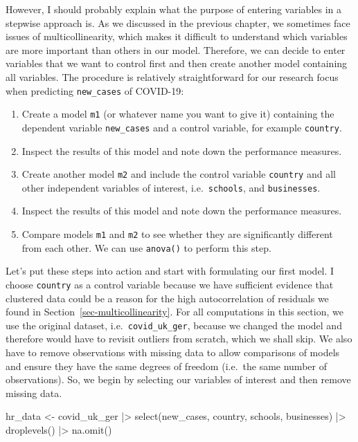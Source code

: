 \documentclass[
  letterpaper,
  DIV=11,
  numbers=noendperiod]{scrreprt}
\newenvironment{Shaded}{\begin{snugshade}}{\end{snugshade}}
\newcommand{\FunctionTok}[1]{\textcolor[rgb]{0.28,0.35,0.67}{#1}}
\newcommand{\NormalTok}[1]{\textcolor[rgb]{0.00,0.23,0.31}{#1}}
\newcommand{\OtherTok}[1]{\textcolor[rgb]{0.00,0.23,0.31}{#1}}
\newcommand{\SpecialCharTok}[1]{\textcolor[rgb]{0.37,0.37,0.37}{#1}}
\providecommand{\tightlist}{%
  \setlength{\itemsep}{0pt}\setlength{\parskip}{0pt}}\usepackage{longtable,booktabs,array}
\begin{document}
However, I should probably explain what the purpose of entering
variables in a stepwise approach is. As we discussed in the previous
chapter, we sometimes face issues of multicollinearity, which makes it
difficult to understand which variables are more important than others
in our model. Therefore, we can decide to enter variables that we want
to control first and then create another model containing all variables.
The procedure is relatively straightforward for our research focus when
predicting \texttt{new\_cases} of COVID-19:

\begin{enumerate}
\def\labelenumi{\arabic{enumi}.}
\tightlist
\item
  Create a model \texttt{m1} (or whatever name you want to give it)
  containing the dependent variable \texttt{new\_cases} and a control
  variable, for example \texttt{country}.
\item
  Inspect the results of this model and note down the performance
  measures.
\item
  Create another model \texttt{m2} and include the control variable
  \texttt{country} and all other independent variables of interest,
  i.e.~\texttt{schools}, and \texttt{businesses}.
\item
  Inspect the results of this model and note down the performance
  measures.
\item
  Compare models \texttt{m1} and \texttt{m2} to see whether they are
  significantly different from each other. We can use \texttt{anova()}
  to perform this step.
\end{enumerate}

Let's put these steps into action and start with formulating our first
model. I choose \texttt{country} as a control variable because we have
sufficient evidence that clustered data could be a reason for the high
autocorrelation of residuals we found in
Section~\ref{sec-multicollinearity}. For all computations in this
section, we use the original dataset, i.e.~\texttt{covid\_uk\_ger},
because we changed the model and therefore would have to revisit
outliers from scratch, which we shall skip. We also have to remove
observations with missing data to allow comparisons of models and ensure
they have the same degrees of freedom (i.e.~the same number of
observations). So, we begin by selecting our variables of interest and
then remove missing data.

\begin{Shaded}
\begin{Highlighting}[]
\NormalTok{hr\_data }\OtherTok{\textless{}{-}}
\NormalTok{  covid\_uk\_ger }\SpecialCharTok{|\textgreater{}}
  \FunctionTok{select}\NormalTok{(new\_cases, country, schools, businesses) }\SpecialCharTok{|\textgreater{}}
  \FunctionTok{droplevels}\NormalTok{() }\SpecialCharTok{|\textgreater{}}
  \FunctionTok{na.omit}\NormalTok{()}
\end{Highlighting}
\end{Shaded}
\end{document}

